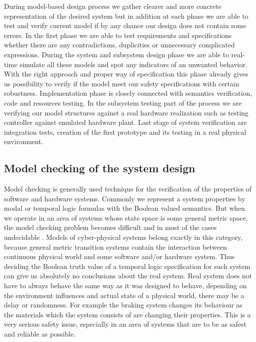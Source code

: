 \documentclass[english,technical,10pt]{FITreport}[2018/01/26]
\begin{document}
During model-based design process we gather clearer and more concrete representation of the desired system but in addition at each phase we are able to test and verify current model if by any chance our design does not contain some errors. In the first phase we are able to test requirements and specifications whether there are any contradictions, duplicities or unnecessary complicated expressions. During the system and subsystem design phase we are able to real-time simulate all these models and spot any indicators of an unwanted behavior. With the right approach and proper way of specification this phase already gives us possibility to verify if the model meet our safety specifications with certain robustness. Implementation phase is closely connected with semantics verification, code and resources testing. In the subsystem testing part of the process we are verifying our model structures against a real hardware realization such as testing controller against emulated hardware plant. Last stage of system verification are integration tests, creation of the first prototype and its testing in a real physical environment.

\subsection{Model checking of the system design}

Model checking is generally used technique for the verification of the properties of software and hardware systems. Commonly we represent a system properties by modal or temporal logic formulas with the Boolean valued semantics. But when we operate in an area of systems whose state space is some general metric space, the model checking problem becomes difficult and in most of the cases undecidable \cite{FAINEKOS:2009}. Models of cyber-physical systems belong exactly in this category, because general metric transition systems contain the interaction between continuous physical world and some software and/or hardware system. Thus deciding the Boolean truth value of a temporal logic specification for such system can give us absolutely no conclusions about the real system. Real system does not have to always behave the same way as it was designed to behave, depending on the environment influences and actual state of a physical world, there may be a delay or randomness. For example the braking system changes its behaviour as the materials which the system consists of are changing their properties. This is a very serious safety issue, especially in an area of systems that are to be as safest and reliable as possible.
\end{document}
